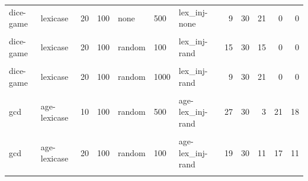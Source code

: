 \documentclass[
]{book}
\begin{document}
\begin{table}
\begin{tabular}{l|l|l|l|l|l|l|r|r|r|r|r}
\hline
\cellcolor{gray!6}{dice-game} & \cellcolor{gray!6}{lexicase} & \cellcolor{gray!6}{20} & \cellcolor{gray!6}{100} & \cellcolor{gray!6}{none} & \cellcolor{gray!6}{100} & \cellcolor{gray!6}{lex\_inj-none} & \cellcolor{gray!6}{10} & \cellcolor{gray!6}{30} & \cellcolor{gray!6}{20} & \cellcolor{gray!6}{0} & \cellcolor{gray!6}{0}\\
\hline
dice-game & lexicase & 20 & 100 & none & 500 & lex\_inj-none & 9 & 30 & 21 & 0 & 0\\
\hline
\cellcolor{gray!6}{dice-game} & \cellcolor{gray!6}{lexicase} & \cellcolor{gray!6}{20} & \cellcolor{gray!6}{100} & \cellcolor{gray!6}{none} & \cellcolor{gray!6}{1000} & \cellcolor{gray!6}{lex\_inj-none} & \cellcolor{gray!6}{14} & \cellcolor{gray!6}{30} & \cellcolor{gray!6}{16} & \cellcolor{gray!6}{0} & \cellcolor{gray!6}{0}\\
\hline
dice-game & lexicase & 20 & 100 & random & 100 & lex\_inj-rand & 15 & 30 & 15 & 0 & 0\\
\hline
\cellcolor{gray!6}{dice-game} & \cellcolor{gray!6}{lexicase} & \cellcolor{gray!6}{20} & \cellcolor{gray!6}{100} & \cellcolor{gray!6}{random} & \cellcolor{gray!6}{500} & \cellcolor{gray!6}{lex\_inj-rand} & \cellcolor{gray!6}{15} & \cellcolor{gray!6}{30} & \cellcolor{gray!6}{15} & \cellcolor{gray!6}{0} & \cellcolor{gray!6}{0}\\
\hline
dice-game & lexicase & 20 & 100 & random & 1000 & lex\_inj-rand & 9 & 30 & 21 & 0 & 0\\
\hline
\cellcolor{gray!6}{gcd} & \cellcolor{gray!6}{age-lexicase} & \cellcolor{gray!6}{10} & \cellcolor{gray!6}{100} & \cellcolor{gray!6}{random} & \cellcolor{gray!6}{100} & \cellcolor{gray!6}{age-lex\_inj-rand} & \cellcolor{gray!6}{19} & \cellcolor{gray!6}{30} & \cellcolor{gray!6}{11} & \cellcolor{gray!6}{29} & \cellcolor{gray!6}{18}\\
\hline
gcd & age-lexicase & 10 & 100 & random & 500 & age-lex\_inj-rand & 27 & 30 & 3 & 21 & 18\\
\hline
\cellcolor{gray!6}{gcd} & \cellcolor{gray!6}{age-lexicase} & \cellcolor{gray!6}{10} & \cellcolor{gray!6}{100} & \cellcolor{gray!6}{random} & \cellcolor{gray!6}{1000} & \cellcolor{gray!6}{age-lex\_inj-rand} & \cellcolor{gray!6}{24} & \cellcolor{gray!6}{30} & \cellcolor{gray!6}{6} & \cellcolor{gray!6}{17} & \cellcolor{gray!6}{13}\\
\hline
gcd & age-lexicase & 20 & 100 & random & 100 & age-lex\_inj-rand & 19 & 30 & 11 & 17 & 11\\
\hline
\cellcolor{gray!6}{gcd} & \cellcolor{gray!6}{age-lexicase} & \cellcolor{gray!6}{20} & \cellcolor{gray!6}{100} & \cellcolor{gray!6}{random} & \cellcolor{gray!6}{500} & \cellcolor{gray!6}{age-lex\_inj-rand} & \cellcolor{gray!6}{20} & \cellcolor{gray!6}{30} & \cellcolor{gray!6}{10} & \cellcolor{gray!6}{7} & \cellcolor{gray!6}{5}\\

\end{tabular}
\end{table}
\end{document}
